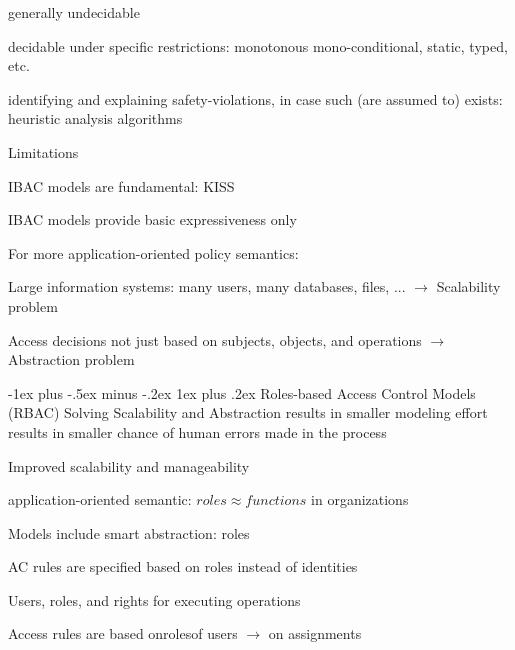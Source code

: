 \documentclass[a4paper]{article}
\makeatletter
\renewcommand{\subsubsection}{\@startsection{subsubsection}{3}{0mm}%
                {-1ex plus -.5ex minus -.2ex}%
                {1ex plus .2ex}%
                {\normalfont\small\bfseries}}
\makeatother
\begin{document}
\begin{multicols}{3}
\begin{itemize*}
\begin{itemize*}
            \item generally undecidable
            \item decidable under specific restrictions: monotonous mono-conditional, static, typed, etc.
            \item identifying and explaining safety-violations, in case such (are assumed to) exists: heuristic analysis algorithms
        \end{itemize*}
        \item Limitations
        \begin{itemize*}
            \item IBAC models are fundamental: KISS
            \item IBAC models provide basic expressiveness only
        \end{itemize*}
        \item For more application-oriented policy semantics:
        \begin{itemize*}
            \item Large information systems: many users, many databases, files, ... $\rightarrow$ Scalability problem
            \item Access decisions not just based on subjects, objects, and operations $\rightarrow$ Abstraction problem
        \end{itemize*}
    \end{itemize*}

    \subsubsection{Roles-based Access Control Models (RBAC)}
    Solving Scalability and Abstraction results in smaller modeling effort results in smaller chance of human errors made in the process
    \begin{itemize*}
        \item Improved scalability and manageability
        \item application-oriented semantic: $roles\approx functions$ in organizations
        \item Models include smart abstraction: roles
        \item AC rules are specified based on roles instead of identities
        \item Users, roles, and rights for executing operations
        \item Access rules are based onrolesof users $\rightarrow$ on assignments
    \end{itemize*}


\end{multicols}
\end{document}
